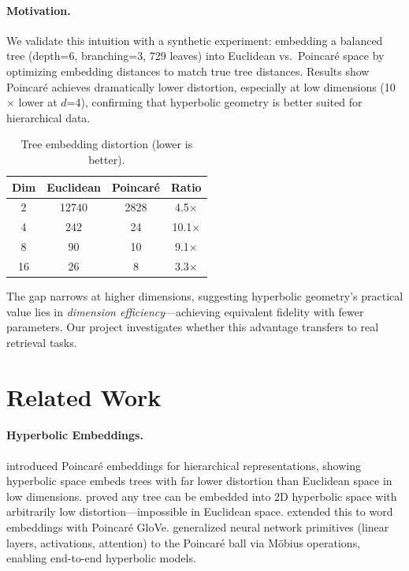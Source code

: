 \documentclass{article}
\begin{document}
\paragraph{Motivation.} We validate this intuition with a synthetic experiment: embedding a balanced tree (depth=6, branching=3, 729 leaves) into Euclidean vs.\ Poincar\'e space by optimizing embedding distances to match true tree distances. Results show Poincar\'e achieves dramatically lower distortion, especially at low dimensions (10$\times$ lower at $d$=4), confirming that hyperbolic geometry is better suited for hierarchical data.

\begin{table}[h]
\centering
\small
\caption{Tree embedding distortion (lower is better).}
\vspace{0.2cm}
\begin{tabular}{@{}cccc@{}}
\toprule
Dim & Euclidean & Poincar\'e & Ratio \\
\midrule
2  & 12740 & 2828 & 4.5$\times$ \\
4  & 242   & 24   & 10.1$\times$ \\
8  & 90    & 10   & 9.1$\times$ \\
16 & 26    & 8    & 3.3$\times$ \\
\bottomrule
\end{tabular}
\end{table}

The gap narrows at higher dimensions, suggesting hyperbolic geometry's practical value lies in \emph{dimension efficiency}---achieving equivalent fidelity with fewer parameters. Our project investigates whether this advantage transfers to real retrieval tasks.

\section{Related Work}

\paragraph{Hyperbolic Embeddings.}
\citet{nickel2017poincare} introduced Poincar\'e embeddings for hierarchical representations, showing hyperbolic space embeds trees with far lower distortion than Euclidean space in low dimensions. \citet{sarkar2011low} proved any tree can be embedded into 2D hyperbolic space with arbitrarily low distortion---impossible in Euclidean space. \citet{tifrea2019poincare} extended this to word embeddings with Poincar\'e GloVe. \citet{ganea2018hyperbolic} generalized neural network primitives (linear layers, activations, attention) to the Poincar\'e ball via M\"obius operations, enabling end-to-end hyperbolic models.
\end{document}
